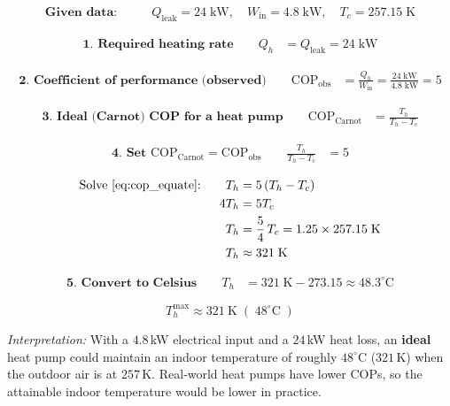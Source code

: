 \documentclass[12pt]{article}
\theoremstyle{definition} %
\theoremstyle{plain} %
\begin{document}
\begin{align}
  \textbf{Given data:}\qquad
    &Q_{\text{leak}} = 24\;\text{kW}, \quad
     W_{\text{in}}   = 4.8\;\text{kW}, \quad
     T_c            = 257.15\;\text{K}
  \end{align}
  
  \begin{align}
  \textbf{1.\  Required heating rate}\qquad
    Q_h &= Q_{\text{leak}}
         = 24\;\text{kW}
  \end{align}
  
  \begin{align}
  \textbf{2.\  Coefficient of performance (observed)}\qquad
    \text{COP}_{\text{obs}}
    &= \frac{Q_h}{W_{\text{in}}}
    = \frac{24\;\text{kW}}{4.8\;\text{kW}}
    = 5
  \end{align}
  
  \begin{align}
  \textbf{3.\  Ideal (Carnot) COP for a heat pump}\qquad
    \text{COP}_{\text{Carnot}}
    &= \frac{T_h}{T_h - T_c}
  \end{align}
  
  \begin{align}
  \textbf{4.\  Set }\text{COP}_{\text{Carnot}} = \text{COP}_{\text{obs}}\qquad
    \frac{T_h}{T_h - T_c} &= 5
    \label{eq:cop_equate}
  \end{align}
  
  \begin{align}
  \text{Solve \eqref{eq:cop_equate}:}\qquad
    T_h &= 5\,(T_h - T_c)\\
    4T_h &= 5T_c\\
    T_h &= \frac{5}{4}\,T_c
         = 1.25 \times 257.15\;\text{K}\\
    T_h &\approx 321\;\text{K}
  \end{align}
  
  \begin{align}
  \textbf{5.\  Convert to Celsius}\qquad
    T_h &= 321\;\text{K} - 273.15
         \approx 48.3^{\circ}\text{C}
  \end{align}
  
  \[
  \boxed{
    T_h^{\max} \approx 321\ \text{K}\;(\;48^{\circ}\text{C}\;)
  }
  \]
  
  \emph{Interpretation:}  
  With a $4.8\,$kW electrical input and a $24\,$kW heat loss, an \textbf{ideal}
  heat pump could maintain an indoor temperature of roughly
  $48^{\circ}\text{C}$ ($321\,$K) when the outdoor air is at $257\,$K.
  Real‐world heat pumps have lower COPs, so the attainable indoor
  temperature would be lower in practice.
\end{document}
